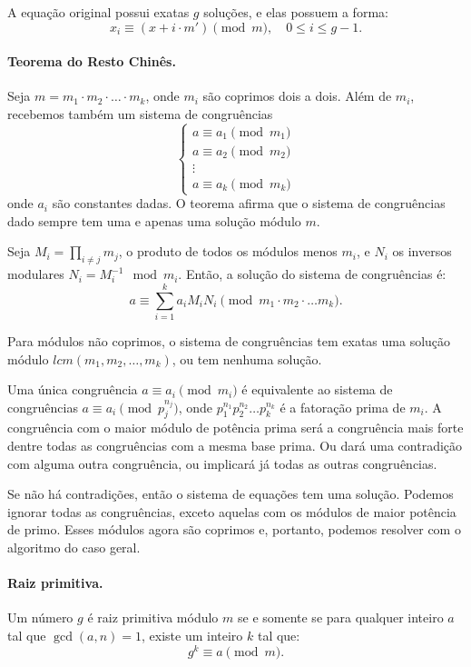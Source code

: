 A equação original possui exatas $g$ soluções, e elas possuem a forma:
$$x_i \equiv (x + i\cdot m') \pmod m, \quad 0 \leq i \leq g-1.$$

\paragraph{Teorema do Resto Chinês.} Seja $m=m_1\cdot m_2 \cdot \dots \cdot m_k$, onde $m_i$ são coprimos dois a dois. Além de $m_i$, recebemos também um sistema de congruências
$$
\begin{cases}
    a \equiv a_1 \pmod {m_1} \\
    a \equiv a_2 \pmod {m_2} \\
    \vdots \\
    a \equiv a_k \pmod {m_k}
\end{cases}
$$
onde $a_i$ são constantes dadas. O teorema afirma que o sistema de congruências dado sempre tem uma e apenas uma solução módulo $m$.

Seja $M_i = \prod_{i \neq j} m_j$, o produto de todos os módulos menos $m_i$, e $N_i$ os inversos modulares $N_i = M_i^{-1} \mod m_i$. Então, a solução do sistema de congruências é:
$$a \equiv \sum_{i=1}^{k} a_iM_iN_i \pmod{m_1\cdot m_2 \cdot \dots m_k}.$$

Para módulos não coprimos, o sistema de congruências tem exatas uma solução módulo $lcm(m_1,m_2,\dots,m_k)$, ou tem nenhuma solução.

Uma única congruência $a \equiv a_i \pmod{m_i}$ é equivalente ao sistema de congruências $a \equiv a_i \pmod{p_j^{n_j}}$, onde $p_1^{n_1}p_2^{n_2}\dots p_k^{n_k}$ é a fatoração prima de $m_i$. A congruência com o maior módulo de potência prima será a congruência mais forte dentre todas as congruências com a mesma base prima. Ou dará uma contradição com alguma outra congruência, ou implicará já todas as outras congruências.

Se não há contradições, então o sistema de equações tem uma solução. Podemos ignorar todas as congruências, exceto aquelas com os módulos de maior potência de primo. Esses módulos agora são coprimos e, portanto, podemos resolver com o algoritmo do caso geral.

\paragraph{Raiz primitiva.} Um número $g$ é raiz primitiva módulo $m$ se e somente se para qualquer inteiro $a$ tal que $\gcd(a,n) = 1$, existe um inteiro $k$ tal que:
$$g^k \equiv a \pmod m.$$


